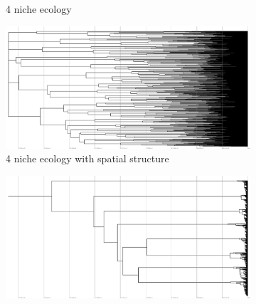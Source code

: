 \begin{figure}
\begin{subfigure}[b]{1\columnwidth}
    \caption{%
      4 niche ecology}
  \end{subfigure}
  \hfill
  \begin{subfigure}[b]{1\columnwidth}
    \includegraphics[height=0.12\textheight,width=\textwidth]{img/perfect-tree-phylogenies-log/epoch=7+resolution=3+treatment=22/a=collapsed-phylogeny+epoch=00007+mut_distn=np.random.standard_normal+num_generations=32768+num_islands=1024+num_niches=4+p_island_migration=0.01+p_niche_invasion=3.0517578125e-08+population_size=3276.../8+replicate=0+tournament_size=2+treatment=22+_generation=262144+_index=22+scale=log+ext=.pdf}
    \caption{%
      4 niche ecology with spatial structure}
  \end{subfigure}
  \hfill
  \begin{subfigure}[b]{1\columnwidth}
    \includegraphics[height=0.12\textheight,width=\textwidth]{img/perfect-tree-phylogenies-log/epoch=7+resolution=3+treatment=20/a=collapsed-phylogeny+epoch=00007+mut_distn=np.random.standard_normal+num_generations=32768+num_islands=1+num_niches=8+p_island_migration=0.01+p_niche_invasion=3.0517578125e-08+population_size=32768+r.../eplicate=0+tournament_size=2+treatment=20+_generation=262144+_index=20+scale=log+ext=.pdf}

\end{subfigure}
\end{figure}
